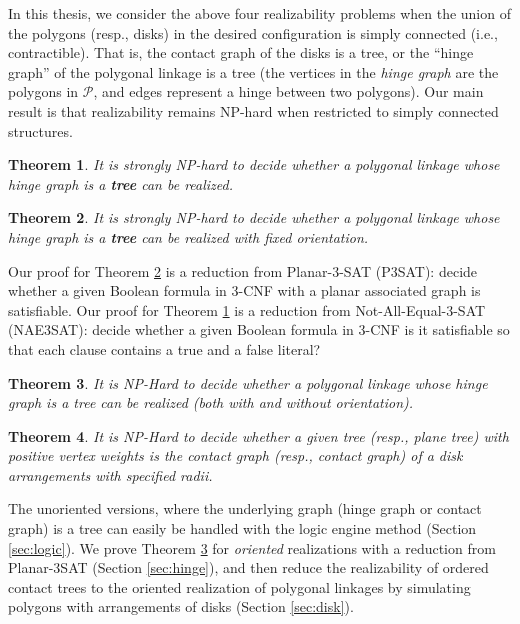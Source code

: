 \documentclass[10pt]{CSUNthesis}
\theoremstyle{plain}%
\newtheorem{thm}{Theorem}
\theoremstyle{definition}
\theoremstyle{remark}
\renewcommand{\PP}{{\mathcal{P}}} %
\begin{document}
In this thesis, we consider the above four realizability problems when the union of the polygons 
(resp., disks) in the desired configuration is simply connected (i.e., contractible). That is, the 
contact graph of the disks is a tree, or the ``hinge graph'' of the polygonal linkage is a tree (the 
vertices in the \emph{hinge graph} are the polygons in $\PP$, and edges represent a hinge between 
two polygons). Our main result is that realizability remains NP-hard when restricted to simply 
connected structures.
 
\begin{thm}\label{thm:hinge2}
It is strongly NP-hard to decide whether a polygonal linkage whose hinge graph is a \textbf{tree} can be realized.
\end{thm}
\begin{thm}\label{thm:hinge3}
It is strongly NP-hard to decide whether a polygonal linkage whose hinge graph is a \textbf{tree} can be realized with fixed orientation.
\end{thm}
Our proof for Theorem \ref{thm:hinge3} is a reduction from {\sc Planar-3-SAT} (P3SAT): decide whether a given Boolean formula in 3-CNF with a planar associated graph is satisfiable. 
Our proof for Theorem \ref{thm:hinge2} is a reduction from {\sc Not-All-Equal-3-SAT} (NAE3SAT): decide whether a given Boolean formula in 3-CNF  is it satisfiable so that each clause contains a true and a false literal?


\begin{thm}\label{thm:hinge}
It is NP-Hard to decide whether a polygonal linkage whose hinge graph is a tree can be realized 
(both with and without orientation).
\end{thm}

\begin{thm}\label{thm:disk}
It is NP-Hard to decide whether a given tree (resp., plane tree) with positive vertex weights
is the contact graph (resp., contact graph) of a disk arrangements with specified radii.
\end{thm}

The unoriented versions, where the underlying graph (hinge graph or contact graph) is a tree can 
easily be handled with the logic engine method (Section \ref{sec:logic}). We prove 
Theorem \ref{thm:hinge} for \emph{oriented} realizations with a reduction from {\sc Planar-3SAT} 
(Section \ref{sec:hinge}), and then reduce the realizability of ordered contact trees to the 
oriented realization of polygonal linkages by simulating polygons with arrangements of disks 
(Section \ref{sec:disk}).
\end{document}
